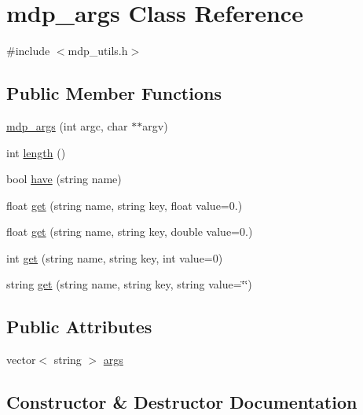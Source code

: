 \hypertarget{classmdp__args}{}\section{mdp\+\_\+args Class Reference}
\label{classmdp__args}


{\ttfamily \#include $<$mdp\+\_\+utils.\+h$>$}

\subsection*{Public Member Functions}
\begin{DoxyCompactItemize}
\item 
\hyperlink{classmdp__args_abeb65a3efd00dbd9d72352fab2b01304}{mdp\+\_\+args} (int argc, char $\ast$$\ast$argv)
\item 
int \hyperlink{classmdp__args_a58c20cc81ff32faccb3d0e6391918ab5}{length} ()
\item 
bool \hyperlink{classmdp__args_a160fdc0fcf2612788d86edc4431110de}{have} (string name)
\item 
float \hyperlink{classmdp__args_a65b9fd580c173e59eb8b1bd85da9d7a4}{get} (string name, string key, float value=0.)
\item 
float \hyperlink{classmdp__args_ab1b9234809ab22ba2f078ae72aa283ec}{get} (string name, string key, double value=0.)
\item 
int \hyperlink{classmdp__args_a7735776e058d61a0be54a13cdb87a014}{get} (string name, string key, int value=0)
\item 
string \hyperlink{classmdp__args_ac84bef25184f9d153f1a7c4f45491bc8}{get} (string name, string key, string value=\char`\"{}\char`\"{})
\end{DoxyCompactItemize}
\subsection*{Public Attributes}
\begin{DoxyCompactItemize}
\item 
vector$<$ string $>$ \hyperlink{classmdp__args_abdf152b512b21a675d83e001023b8fad}{args}
\end{DoxyCompactItemize}


\subsection{Constructor \& Destructor Documentation}
\mbox{\label{classmdp__args_abeb65a3efd00dbd9d72352fab2b01304}} 
